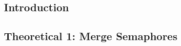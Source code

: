 \documentclass[11pt,a4paper]{article}
\theoremstyle{plain}
\theoremstyle{definition}
\theoremstyle{remark}
\numberwithin{equation}{section}
\begin{document}

\clearpage\maketitle
\thispagestyle{empty}
\clearpage\newpage
\thispagestyle{plain}


\subsection*{Introduction}




\subsection*{Theoretical 1: Merge Semaphores}
\end{document}
